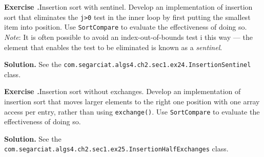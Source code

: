 \documentclass[12pt, a4paper]{article}
\newenvironment{ex}[2][Exercise]
{\par\medskip\noindent \textbf{#1 #2.}}
{\medskip}
\newenvironment{sol}[1][Solution]
{\par\medskip\noindent \textbf{#1.} }
{\medskip}
\begin{document}
	\begin{ex}{24}
		\emph{Insertion sort with sentinel}. Develop an implementation of insertion sort
		that eliminates the \texttt{j>0} test in the inner loop by first putting the
		smallest item into position. Use \texttt{SortCompare} to evaluate the effectiveness
		of doing so. \emph{Note}: It is often possible to avoid an index-out-of-bounds
		test i this way --- the element that enables the test to be eliminated is known
		as a \emph{sentinel}.
	\end{ex}
	\begin{sol}
		See the \texttt{com.segarciat.algs4.ch2.sec1.ex24.InsertionSentinel} class.
	\end{sol}
	\begin{ex}{25}
		\emph{Insertion sort without exchanges}. Develop an implementation of insertion
		sort that moves larger elements to the right one position with one array access
		per entry, rather than using \texttt{exchange()}.
		Use \texttt{SortCompare} to evaluate the effectiveness of doing so.
	\end{ex}
	\begin{sol}
		See the \texttt{com.segarciat.algs4.ch2.sec1.ex25.InsertionHalfExchanges} class.
	\end{sol}
	\pagebreak
	\printbibliography
\end{document}
